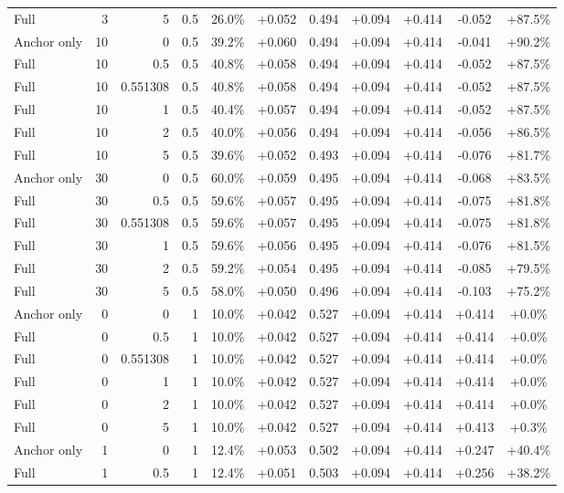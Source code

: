 \begin{table}[htbp]
\begin{tabular}{lrrrccccccc}
Full & 3 & 5 & 0.5 & 26.0\% & +0.052 & 0.494 & +0.094 & +0.414 & -0.052 & +87.5\% \\
Anchor only & 10 & 0 & 0.5 & 39.2\% & +0.060 & 0.494 & +0.094 & +0.414 & -0.041 & +90.2\% \\
Full & 10 & 0.5 & 0.5 & 40.8\% & +0.058 & 0.494 & +0.094 & +0.414 & -0.052 & +87.5\% \\
Full & 10 & 0.551308 & 0.5 & 40.8\% & +0.058 & 0.494 & +0.094 & +0.414 & -0.052 & +87.5\% \\
Full & 10 & 1 & 0.5 & 40.4\% & +0.057 & 0.494 & +0.094 & +0.414 & -0.052 & +87.5\% \\
Full & 10 & 2 & 0.5 & 40.0\% & +0.056 & 0.494 & +0.094 & +0.414 & -0.056 & +86.5\% \\
Full & 10 & 5 & 0.5 & 39.6\% & +0.052 & 0.493 & +0.094 & +0.414 & -0.076 & +81.7\% \\
Anchor only & 30 & 0 & 0.5 & 60.0\% & +0.059 & 0.495 & +0.094 & +0.414 & -0.068 & +83.5\% \\
Full & 30 & 0.5 & 0.5 & 59.6\% & +0.057 & 0.495 & +0.094 & +0.414 & -0.075 & +81.8\% \\
Full & 30 & 0.551308 & 0.5 & 59.6\% & +0.057 & 0.495 & +0.094 & +0.414 & -0.075 & +81.8\% \\
Full & 30 & 1 & 0.5 & 59.6\% & +0.056 & 0.495 & +0.094 & +0.414 & -0.076 & +81.5\% \\
Full & 30 & 2 & 0.5 & 59.2\% & +0.054 & 0.495 & +0.094 & +0.414 & -0.085 & +79.5\% \\
Full & 30 & 5 & 0.5 & 58.0\% & +0.050 & 0.496 & +0.094 & +0.414 & -0.103 & +75.2\% \\
Anchor only & 0 & 0 & 1 & 10.0\% & +0.042 & 0.527 & +0.094 & +0.414 & +0.414 & +0.0\% \\
Full & 0 & 0.5 & 1 & 10.0\% & +0.042 & 0.527 & +0.094 & +0.414 & +0.414 & +0.0\% \\
Full & 0 & 0.551308 & 1 & 10.0\% & +0.042 & 0.527 & +0.094 & +0.414 & +0.414 & +0.0\% \\
Full & 0 & 1 & 1 & 10.0\% & +0.042 & 0.527 & +0.094 & +0.414 & +0.414 & +0.0\% \\
Full & 0 & 2 & 1 & 10.0\% & +0.042 & 0.527 & +0.094 & +0.414 & +0.414 & +0.0\% \\
Full & 0 & 5 & 1 & 10.0\% & +0.042 & 0.527 & +0.094 & +0.414 & +0.413 & +0.3\% \\
Anchor only & 1 & 0 & 1 & 12.4\% & +0.053 & 0.502 & +0.094 & +0.414 & +0.247 & +40.4\% \\
Full & 1 & 0.5 & 1 & 12.4\% & +0.051 & 0.503 & +0.094 & +0.414 & +0.256 & +38.2\% \\

\end{tabular}
\end{table}
